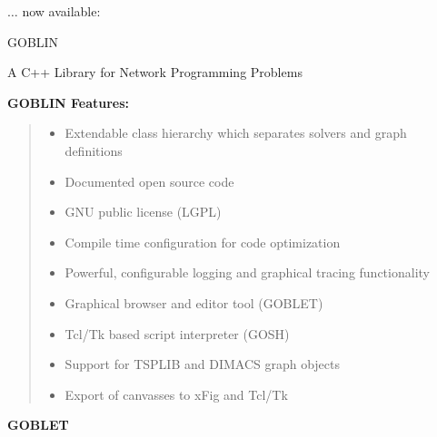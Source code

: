 \documentclass{report}
\begin{document}
\textwidth21cm

\pagestyle{empty}
\begin{landscape}
\begin{center}
\vspace*{1cm}
{$\dots$ now available:}

\vspace*{3cm}
{\HUGE GOBLIN}

\vspace*{2cm}
{\huge A C++ Library for Network Programming Problems}
\end{center}

\clearpage
{\Huge\bf GOBLIN Features:}
{\huge
\vspace*{1cm}
\begin{quote}
\begin{itemize}
\item Extendable class hierarchy which separates solvers and graph definitions
\item Documented open source code
\item GNU public license (LGPL)
\item Compile time configuration for code optimization
\item Powerful, configurable logging and graphical tracing functionality
\item Graphical browser and editor tool (GOBLET)
\item Tcl/Tk based script interpreter (GOSH)
\item Support for TSPLIB and DIMACS graph objects
\item Export of canvasses to xFig and Tcl/Tk
\end{itemize}
\end{quote}}


\clearpage
\begin{minipage}{6.5cm}
\vspace*{3.6cm}
{\Huge\bf GOBLET

}
\end{minipage}
\end{landscape}
\end{document}
